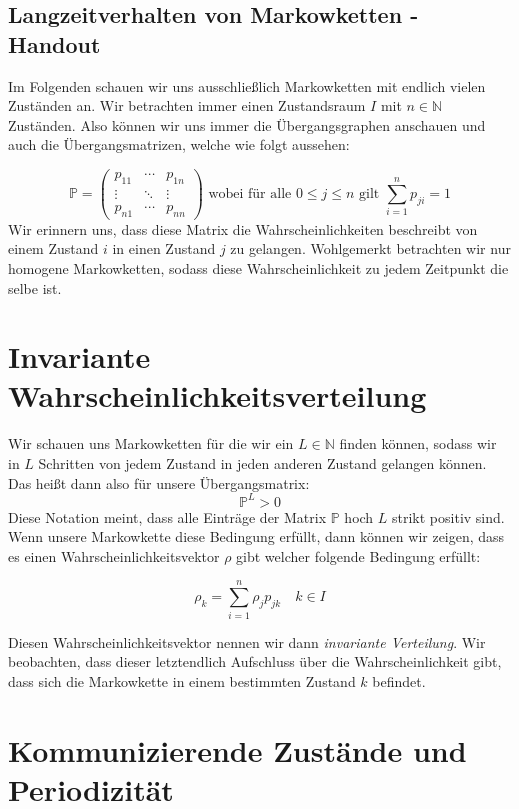 \documentclass[a4paper]{article}
\begin{document}
\begin{center}
	\section*{Langzeitverhalten von Markowketten - Handout}
\end{center}

Im Folgenden schauen wir uns ausschließlich Markowketten mit endlich vielen Zuständen an.
Wir betrachten immer einen Zustandsraum $I$ mit $n \in \mathbb{N}$ Zuständen.
Also können wir uns immer die Übergangsgraphen anschauen und auch die Übergangsmatrizen,
welche wie folgt aussehen:

\[
\mathbb{P} = \begin{pmatrix} 
	p_{11} & \cdots & p_{1n} \\
	\vdots & \ddots & \vdots \\
	p_{n1} & \cdots & p_{nn}
\end{pmatrix} 
\text{ wobei für alle $0 \leq j \leq n$ gilt }
\sum_{i=1}^{n} p_{ji} = 1
\]
Wir erinnern uns, dass diese Matrix die Wahrscheinlichkeiten beschreibt von einem Zustand $i$ in einen
Zustand $j$ zu gelangen. Wohlgemerkt betrachten wir nur homogene Markowketten, sodass diese Wahrscheinlichkeit
zu jedem Zeitpunkt die selbe ist.

\section{Invariante Wahrscheinlichkeitsverteilung}
Wir schauen uns Markowketten für die wir ein $L \in \mathbb{N}$ finden können, sodass
wir in $L$ Schritten von jedem Zustand in jeden anderen Zustand gelangen können.
Das heißt dann also für unsere Übergangsmatrix:
\[
\mathbb{P} ^{L} > 0
\] 
Diese Notation meint, dass alle Einträge der Matrix $\mathbb{P}$ hoch $L$ strikt positiv sind.
Wenn unsere Markowkette diese Bedingung erfüllt, dann können wir zeigen, dass es einen
Wahrscheinlichkeitsvektor $\rho$ gibt welcher folgende Bedingung erfüllt:

\[
\rho_k = \sum_{i=1}^{n} \rho_j p_{jk} \quad k \in I
\]

Diesen Wahrscheinlichkeitsvektor nennen wir dann \textit{invariante Verteilung}.
Wir beobachten, dass dieser letztendlich Aufschluss über die Wahrscheinlichkeit gibt, dass sich die
Markowkette in einem bestimmten Zustand $k$ befindet.

\section{Kommunizierende Zustände und Periodizität}
\end{document}
